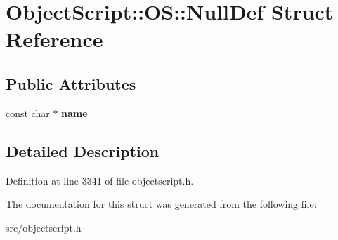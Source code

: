 \hypertarget{struct_object_script_1_1_o_s_1_1_null_def}{}\section{Object\+Script\+:\+:OS\+:\+:Null\+Def Struct Reference}
\label{struct_object_script_1_1_o_s_1_1_null_def}
\subsection*{Public Attributes}
\begin{DoxyCompactItemize}
\item 
const char $\ast$ {\bfseries name}\hypertarget{struct_object_script_1_1_o_s_1_1_null_def_a0ec79e34c6bc20637f9b1960c6c56e83}{}\label{struct_object_script_1_1_o_s_1_1_null_def_a0ec79e34c6bc20637f9b1960c6c56e83}

\end{DoxyCompactItemize}


\subsection{Detailed Description}


Definition at line 3341 of file objectscript.\+h.



The documentation for this struct was generated from the following file\+:\begin{DoxyCompactItemize}
\item 
src/objectscript.\+h\end{DoxyCompactItemize}
